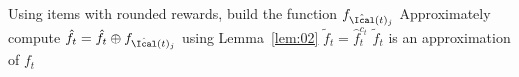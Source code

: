 \begin{algorithm}[ht]
\begin{algorithmic}[1]
		\Comment Using items with rounded rewards, build the function $f_{\hat{\Ical}(t)_j}$
		\State Approximately compute $\hat{f}_t = \hat{f}_t\oplus f_{\hat{\Ical}(t)_j}$ using Lemma~\ref{lem:02}
		\EndFor
		\State $\tilde{f}_t = \hat{f}_t^{c_t}$
		\Comment $\tilde{f}_t$ is an approximation of $f_t$
		\EndFor
	\end{algorithmic}
\end{algorithm}

